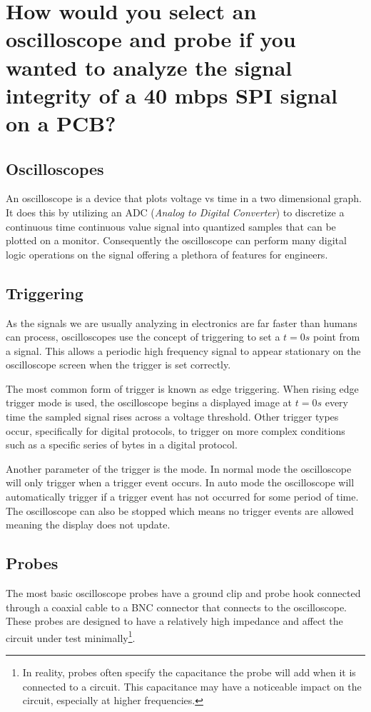 \documentclass[main.tex]{subfiles}
\begin{document}
\section{How would you select an oscilloscope and probe if you wanted to analyze the signal integrity of a 40 mbps SPI signal on a PCB?}

\subsection{Oscilloscopes}
An oscilloscope is a device that plots voltage vs time in a two dimensional graph. It does this by utilizing an ADC (\textit{Analog to Digital Converter}) to discretize a continuous time continuous value signal into quantized samples that can be plotted on a monitor. Consequently the oscilloscope can perform many digital logic operations on the signal offering a plethora of features for engineers. 

\subsection{Triggering}
As the signals we are usually analyzing in electronics are far faster than humans can process, oscilloscopes use the concept of triggering to set a $t=0s$ point from a signal. This allows a periodic high frequency signal to appear stationary on the oscilloscope screen when the trigger is set correctly. 

The most common form of trigger is known as edge triggering. When rising edge trigger mode is used, the oscilloscope begins a displayed image at $t=0s$ every time the sampled signal rises across a voltage threshold. Other trigger types occur, specifically for digital protocols, to trigger on more complex conditions such as a specific series of bytes in a digital protocol. 

Another parameter of the trigger is the mode. In normal mode the oscilloscope will only trigger when a trigger event occurs. In auto mode the oscilloscope will automatically trigger if a trigger event has not occurred for some period of time. The oscilloscope can also be stopped which means no trigger events are allowed meaning the display does not update.  

\subsection{Probes}
The most basic oscilloscope probes have a ground clip and probe hook connected through a coaxial cable to a BNC connector that connects to the oscilloscope. These probes are designed to have a relatively high impedance and affect the circuit under test minimally\footnote{In reality, probes often specify the capacitance the probe will add when it is connected to a circuit. This capacitance may have a noticeable impact on the circuit, especially at higher frequencies.}.
\end{document}
